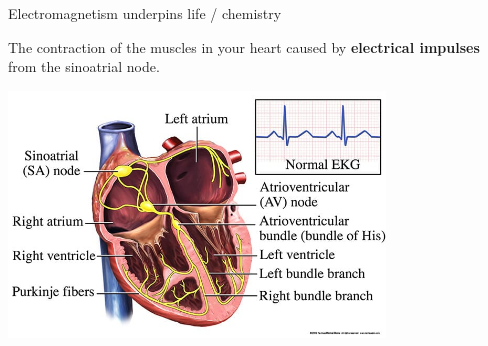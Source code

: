 \begin{frame}{Electromagnetism underpins life / chemistry}

  {\scriptsize
  The contraction of the muscles in your heart caused by
  {\bf electrical impulses} from the sinoatrial node.
  }

  \begin{center}
     \includegraphics[width=0.75\textwidth]{./images/misc/electrical_system_heart_2.jpg}\\
  \end{center}

\end{frame}

%
%
%

